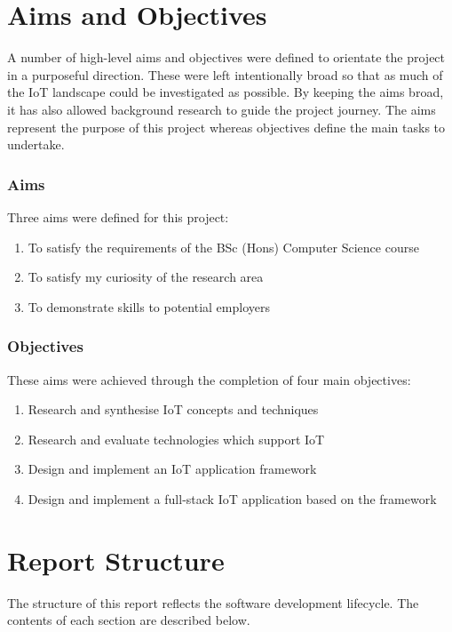   \section{Aims and Objectives}
    A number of high-level aims and objectives were defined to orientate the project in a purposeful direction. These were left intentionally broad so that as much of the IoT landscape could be investigated as possible. By keeping the aims broad, it has also allowed background research to guide the project journey. The aims represent the purpose of this project whereas objectives define the main tasks to undertake.

    \subsubsection{Aims}
    Three aims were defined for this project:
    \begin{enumerate}
      \item To satisfy the requirements of the BSc (Hons) Computer Science course
      \item To satisfy my curiosity of the research area
      \item To demonstrate skills to potential employers
    \end{enumerate}

    \subsubsection{Objectives}
    These aims were achieved through the completion of four main objectives:
    \begin{enumerate}
      \item Research and synthesise IoT concepts and techniques
      \item Research and evaluate technologies which support IoT
      \item Design and implement an IoT application framework
      \item Design and implement a full-stack IoT application based on the framework
    \end{enumerate}

  \section{Report Structure}
    The structure of this report reflects the software development lifecycle. The contents of each section are described below.

